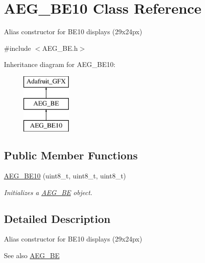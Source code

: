 \hypertarget{class_a_e_g___b_e10}{}\section{A\+E\+G\+\_\+\+B\+E10 Class Reference}
\label{class_a_e_g___b_e10}


Alias constructor for B\+E10 displays (29x24px)  




{\ttfamily \#include $<$A\+E\+G\+\_\+\+B\+E.\+h$>$}

Inheritance diagram for A\+E\+G\+\_\+\+B\+E10\+:\begin{figure}[H]
\begin{center}
\leavevmode
\includegraphics[height=3.000000cm]{class_a_e_g___b_e10}
\end{center}
\end{figure}
\subsection*{Public Member Functions}
\begin{DoxyCompactItemize}
\item 
\mbox{\hyperlink{class_a_e_g___b_e10_af406607c342a0afffbc7991e32848552}{A\+E\+G\+\_\+\+B\+E10}} (uint8\+\_\+t, uint8\+\_\+t, uint8\+\_\+t)
\begin{DoxyCompactList}\small\item\em Initializes a {\ttfamily \mbox{\hyperlink{class_a_e_g___b_e}{A\+E\+G\+\_\+\+BE}}} object. \end{DoxyCompactList}\end{DoxyCompactItemize}


\subsection{Detailed Description}
Alias constructor for B\+E10 displays (29x24px) 

\begin{DoxySeeAlso}{See also}
\mbox{\hyperlink{class_a_e_g___b_e}{A\+E\+G\+\_\+\+BE}} 
\end{DoxySeeAlso}


